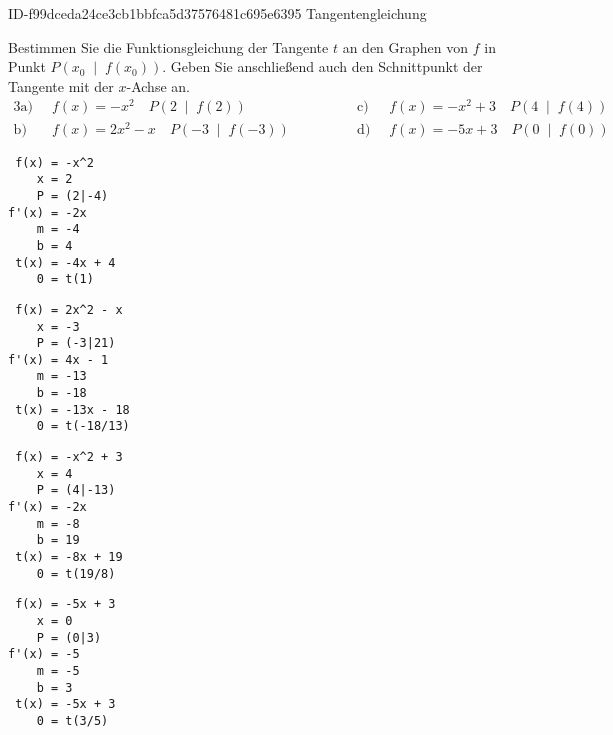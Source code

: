 \begin{exercise}
      {ID-f99dceda24ce3cb1bbfca5d37576481c695e6395}
      {Tangentengleichung}
  \ifproblem\problem\par
    Bestimmen Sie die Funktionsgleichung der
    Tangente $t$ an den Graphen von $f$ in
    Punkt $P\left(x_0\;\middle|\;f(x_0)\right)$.
    Geben Sie anschließend auch den Schnittpunkt
    der Tangente mit der $x$-Achse an.
    \begin{alignat*}{3}
      \text{a)}&\;\;
      f(x)=-x^{2}
      \quad
      P\left(\num{2}\;\middle|\;f(\num{2})\right)
      \qquad&\qquad
      \text{c)}&\;\;
      f(x)=-x^{2}+\num{3}
      \quad
      P\left(\num{4}\;\middle|\;f(\num{4})\right)
      \\[1ex]
      \text{b)}&\;\;
      f(x)=\num{2}x^{2}-x
      \quad
      P\left(-\num{3}\;\middle|\;f(-\num{3})\right)
      \qquad&\qquad
      \text{d)}&\;\;
      f(x)=-\num{5}x+\num{3}
      \quad
      P\left(\num{0}\;\middle|\;f(\num{0})\right)
    \end{alignat*}
  \fi
  \ifoutcome\outcome\par
\begin{minipage}{9em}
\begin{verbatim}
 f(x) = -x^2    
    x = 2       
    P = (2|-4)  
f'(x) = -2x     
    m = -4      
    b = 4       
 t(x) = -4x + 4 
    0 = t(1)    
\end{verbatim}
\end{minipage}\hfill
\begin{minipage}{9em}
\begin{verbatim}
 f(x) = 2x^2 - x  
    x = -3        
    P = (-3|21)   
f'(x) = 4x - 1    
    m = -13       
    b = -18       
 t(x) = -13x - 18 
    0 = t(-18/13) 
\end{verbatim}
\end{minipage}\hfill
\begin{minipage}{9em}
\begin{verbatim}
 f(x) = -x^2 + 3 
    x = 4        
    P = (4|-13)  
f'(x) = -2x      
    m = -8       
    b = 19       
 t(x) = -8x + 19 
    0 = t(19/8)  
\end{verbatim}
\end{minipage}\hfill
\begin{minipage}{9em}
\begin{verbatim}
 f(x) = -5x + 3 
    x = 0       
    P = (0|3)   
f'(x) = -5      
    m = -5      
    b = 3       
 t(x) = -5x + 3 
    0 = t(3/5)  
\end{verbatim}
\end{minipage}\par
  \fi
\end{exercise}
